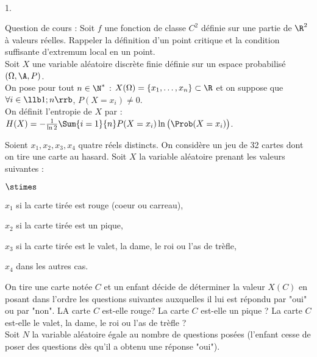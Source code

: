 \documentclass[11pt]{article}%
\begin{document}
\newpage



\begin{exerciceAP}~
  \begin{noliste}{1.}
    \setlength{\itemsep}{2mm}
  \item Question de cours : Soit $f$ une fonction de classe $C^2$
    définie sur une partie de $\R^2$ à valeurs réelles. Rappeler la
    définition d'un point critique et la condition suffisante
    d'extremum local en un point.\\

    Soit $X$ une variable aléatoire discrète finie définie sur un
    espace probabilisé $(\Omega , \A , P)$.\\
    On pose pour tout $n \in \N^*$ : $X ( \Omega ) = \{ x_1 , \dots ,
    x_n \} \subset \R$ et on suppose que $\forall i \in \llb 1 ; n
    \rrb$, $P (X=x_i) \neq 0$.\\

    On définit l'entropie de $X$ par : $ H(X) = - \frac{ 1 }{ \ln 2 }
    \Sum{i=1}{n} P (X=x_i) \ln \big( \Prob(X=x_i) \big)$.

  \item Soient $x_1 , x_2 , x_3 , x_4$ quatre réels distincts. On
    considère un jeu de 32 cartes dont on tire une carte au
    hasard. Soit $X$ la variable aléatoire prenant les valeurs
    suivantes : 
    \begin{noliste}{$\stimes$}
    \item $x_1$ si la carte tirée est rouge (coeur ou carreau),
    \item $x_2$ si la carte tirée est un pique,
    \item $x_3$ si la carte tirée est le valet, la dame, le roi ou
      l'as de trèfle,
    \item $x_4$ dans les autres cas.
    \end{noliste}

    On tire une carte notée $C$ et un enfant décide de déterminer la
    valeur $X(C)$ en posant dans l'ordre les questions suivantes
    auxquelles il lui est répondu par "oui" ou par "non". LA carte $C$
    est-elle rouge? La carte $C$ est-elle un pique ? La carte $C$
    est-elle le valet, la dame, le roi ou l'as de trèfle ? \\
    Soit $N$ la variable aléatoire égale au nombre de questions posées
    (l'enfant cesse de poser des questions dès qu'il a obtenu une
    réponse "oui"). 


\end{noliste}
\end{exerciceAP}
\end{document}
